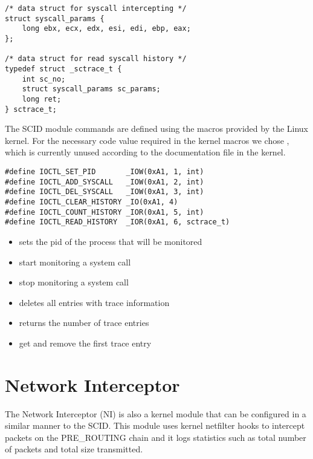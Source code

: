 \lstset{language=C,caption=SCID data structures,label=lst:scid-struct}
\begin{lstlisting}
/* data struct for syscall intercepting */
struct syscall_params {
	long ebx, ecx, edx, esi, edi, ebp, eax;
};

/* data struct for read syscall history */
typedef struct _sctrace_t {
	int sc_no;
	struct syscall_params sc_params;
	long ret;
} sctrace_t;
\end{lstlisting}

The SCID module  commands are defined using the macros provided by the Linux kernel. For the necessary code value required in the kernel macros we chose , which is currently unused according to the documentation file in the kernel.

\lstset{language=C,caption=Command macros for ioctl,label=lst:scid-ioctl}
\begin{lstlisting}
#define IOCTL_SET_PID		_IOW(0xA1, 1, int)
#define IOCTL_ADD_SYSCALL	_IOW(0xA1, 2, int)
#define IOCTL_DEL_SYSCALL	_IOW(0xA1, 3, int)
#define IOCTL_CLEAR_HISTORY	_IO(0xA1, 4)
#define IOCTL_COUNT_HISTORY	_IOR(0xA1, 5, int)
#define IOCTL_READ_HISTORY	_IOR(0xA1, 6, sctrace_t)
\end{lstlisting}

\begin{itemize}
	\item {} sets the pid of the process that will be monitored
	\item {} start monitoring a system call
	\item {} stop monitoring a system call
	\item {} deletes all entries with trace information
	\item {} returns the number of trace entries
	\item {} get and remove the first trace entry
\end{itemize}

\section{Network Interceptor}
\label{fourth:ni}

The Network Interceptor (NI) is also a kernel module that can be configured in a similar manner to the SCID. This module uses kernel netfilter hooks to intercept packets on the PRE_ROUTING chain and it logs statistics such as total number of packets and total size transmitted.

